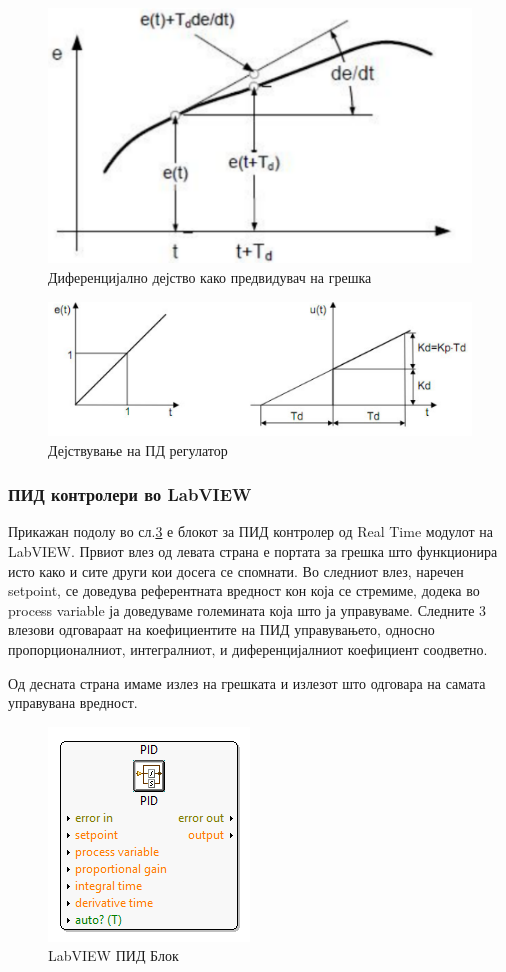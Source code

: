 \documentclass{article}
\begin{document}
\begin{figure}[H]
\includegraphics[width=0.3\linewidth]{el_8.png}
\centering
\caption{Диференцијално дејство како предвидувач на грешка}
\label{fig:el_8.png}
\end{figure}

\begin{figure}[H]
\includegraphics[width=0.3\linewidth]{el_9.png}
\centering
\caption{Дејствување на ПД регулатор}
\label{fig:el_9.png}
\end{figure}



\subsubsection{ПИД контролери во LabVIEW}

Прикажан подолу во сл.\ref{fig:PIDBlock.png} е блокот за ПИД контролер од Real Time модулот на LabVIEW. Првиот влез од левата страна е портата за грешка што функционира исто како и сите други кои досега се спомнати. Во следниот влез, наречен setpoint, се доведува референтната вредност кон која се стремиме, додека во process variable ја доведуваме големината која што ја управуваме. Следните 3 влезови одговараат на коефициентите на ПИД управувањето, односно пропорционалниот, интегралниот, и диференцијалниот коефициент соодветно.

Од десната страна имаме излез на грешката и излезот што одговара на самата управувана вредност.

\begin{figure}[H]
\includegraphics[width=0.3\linewidth]{PIDBlock.png}
\centering
\caption{LabVIEW ПИД Блок}
\label{fig:PIDBlock.png}
\end{figure}
\end{document}
